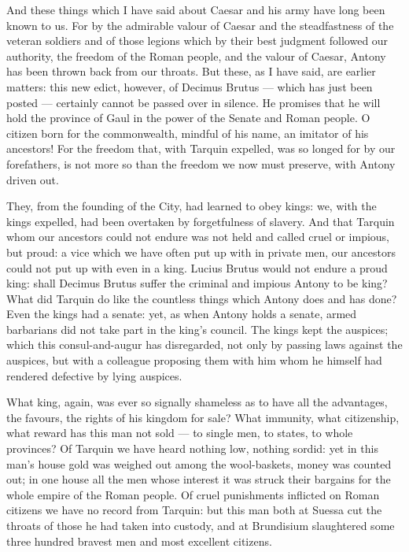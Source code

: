  And these things which I have said about Caesar and his army have long been known to us. For by the admirable valour of Caesar and the steadfastness of the veteran soldiers and of those legions which by their best judgment followed our authority, the freedom of the Roman people, and the valour of Caesar, Antony has been thrown back from our throats. But these, as I have said, are earlier matters: this new edict, however, of Decimus Brutus --- which has just been posted --- certainly cannot be passed over in silence. He promises that he will hold the province of Gaul in the power of the Senate and Roman people. O citizen born for the commonwealth, mindful of his name, an imitator of his ancestors! For the freedom that, with Tarquin expelled, was so longed for by our forefathers, is not more so than the freedom we now must preserve, with Antony driven out.

 They, from the founding of the City, had learned to obey kings: we, with the kings expelled, had been overtaken by forgetfulness of slavery. And that Tarquin whom our ancestors could not endure was not held and called cruel or impious, but proud: a vice which we have often put up with in private men, our ancestors could not put up with even in a king. Lucius Brutus would not endure a proud king: shall Decimus Brutus suffer the criminal and impious Antony to be king? What did Tarquin do like the countless things which Antony does and has done? Even the kings had a senate: yet, as when Antony holds a senate, armed barbarians did not take part in the king's council. The kings kept the auspices; which this consul-and-augur has disregarded, not only by passing laws against the auspices, but with a colleague proposing them with him whom he himself had rendered defective by lying auspices.

 What king, again, was ever so signally shameless as to have all the advantages, the favours, the rights of his kingdom for sale? What immunity, what citizenship, what reward has this man not sold --- to single men, to states, to whole provinces? Of Tarquin we have heard nothing low, nothing sordid: yet in this man's house gold was weighed out among the wool-baskets, money was counted out; in one house all the men whose interest it was struck their bargains for the whole empire of the Roman people. Of cruel punishments inflicted on Roman citizens we have no record from Tarquin: but this man both at Suessa cut the throats of those he had taken into custody, and at Brundisium slaughtered some three hundred bravest men and most excellent citizens.

